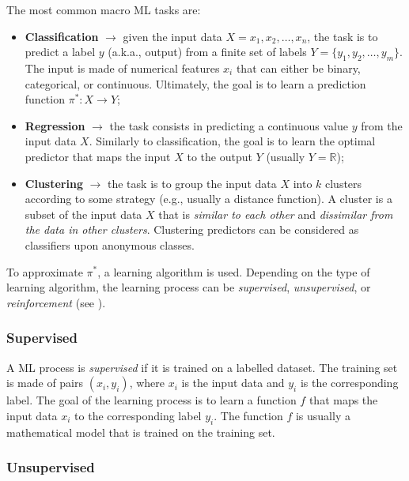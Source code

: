 The most common macro \gls{ML} tasks are:
%
\begin{itemize}
    \item \textbf{Classification} $\rightarrow$ given the input data $X={x_1, x_2, \dots, x_n}$, the task is to predict a label $y$ (a.k.a., output) from a finite set of labels $Y=\{y_1, y_2, \dots, y_m\}$.
    The input is made of numerical features $x_i$ that can either be binary, categorical, or continuous.
    Ultimately, the goal is to learn a prediction function $\pi^{*}: X \rightarrow Y$;
    \item \textbf{Regression} $\rightarrow$ the task consists in predicting a continuous value $y$ from the input data $X$.
    Similarly to classification, the goal is to learn the optimal predictor that maps the input $X$ to the output $Y$ (usually $Y=\mathbb{R}$);
    \item \textbf{Clustering} $\rightarrow$ the task is to group the input data $X$ into $k$ clusters according to some strategy (e.g., usually a distance function).
    A cluster is a subset of the input data $X$ that is \emph{similar to each other} and \emph{dissimilar from the data in other clusters}.
    Clustering predictors can be considered as classifiers upon anonymous classes.
\end{itemize}
%
To approximate $\pi^{*}$, a learning algorithm is used.
%
Depending on the type of learning algorithm, the learning process can be \emph{supervised}, \emph{unsupervised}, or \emph{reinforcement} (see ).
%

\subsubsection{Supervised}\label{subsubsec:supervised}
%
A \gls{ML} process is \emph{supervised} if it is trained on a labelled dataset.
%
The training set is made of pairs $(x_i, y_i)$, where $x_i$ is the input data and $y_i$ is the corresponding label.
%
The goal of the learning process is to learn a function $f$ that maps the input data $x_i$ to the corresponding label $y_i$.
%
The function $f$ is usually a mathematical model that is trained on the training set.
%


\subsubsection{Unsupervised}\label{subsubsec:unsupervised}

